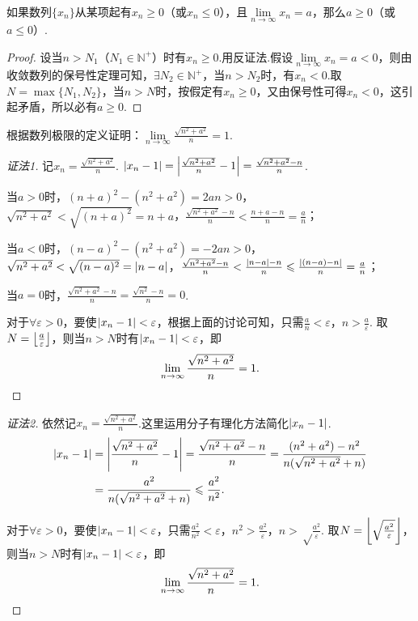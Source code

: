 \begin{corollary}
如果数列\(\{x_n\}\)从某项起有\(x_n \geqslant 0\)（或\(x_n \leqslant 0\)），且\(\lim\limits_{n\to\infty}x_n = a\)，那么\(a \geqslant 0\)（或\(a \leqslant 0\)）.
\begin{proof}
设当\(n > N_1\)（\(N_1 \in \mathbb{N}^+\)）时有\(x_n \geqslant 0\).用反证法.假设\(\lim\limits_{n\to\infty}x_n = a < 0\)，则由收敛数列的保号性定理可知，\(\exists N_2 \in \mathbb{N}^+\)，当\(n > N_2\)时，有\(x_n < 0\).取\(N = \max\{N_1,N_2\}\)，当\(n > N\)时，按假定有\(x_n \geqslant 0\)，又由保号性可得\(x_n < 0\)，这引起矛盾，所以必有\(a \geqslant 0\).
\end{proof}
\end{corollary}

\begin{example}
\def\l{\lim\limits_{n\to\infty}}
\def\ys{\l \frac{\sqrt{n^2+a^2}}{n}}
根据数列极限的定义证明：\(\ys = 1\).
\begin{proof}[证法1]
记\(x_n = \frac{\sqrt{n^2+a^2}}{n}\).
\(\abs{x_n-1} = \abs{\frac{\sqrt{n^2+a^2}}{n}-1} = \frac{\sqrt{n^2+a^2}-n}{n}\).

当\(a > 0\)时，\((n+a)^2-(n^2+a^2)=2an>0\)，\(\sqrt{n^2+a^2}<\sqrt{(n+a)^2}=n+a\)，\(\frac{\sqrt{n^2+a^2}-n}{n} < \frac{n+a-n}{n} = \frac{a}{n}\)；

当\(a < 0\)时，\((n-a)^2-(n^2+a^2)=-2an>0\)，\(\sqrt{n^2+a^2}<\sqrt{(n-a)^2}=\abs{n-a}\)，\(\frac{\sqrt{n^2+a^2}-n}{n} < \frac{\abs{n-a}-n}{n} \leqslant \frac{\abs{(n-a)-n}}{n} = \frac{a}{n}\)；

当\(a = 0\)时，\(\frac{\sqrt{n^2+a^2}-n}{n} = \frac{\sqrt{n^2}-n}{n} = 0\).

对于\(\forall\varepsilon>0\)，要使\(\abs{x_n-1}<\varepsilon\)，根据上面的讨论可知，只需\(\frac{a}{n}<\varepsilon\)，\(n>\frac{a}{\varepsilon}\).
取\(N = \floor*{\frac{a}{\varepsilon}}\)，则当\(n>N\)时有\(\abs{x_n-1}<\varepsilon\)，即\[
\ys = 1.
\qedhere
\]
\end{proof}
\begin{proof}[证法2]
依然记\(x_n = \frac{\sqrt{n^2+a^2}}{n}\).这里运用分子有理化方法简化\(\abs{x_n-1}\).
\begin{align*}
\abs{x_n-1} &= \abs{\frac{\sqrt{n^2+a^2}}{n}-1}
= \frac{\sqrt{n^2+a^2}-n}{n}
= \frac{(n^2+a^2)-n^2}{n (\sqrt{n^2+a^2}+n)} \\
&= \frac{a^2}{n (\sqrt{n^2+a^2}+n)}
\leqslant \frac{a^2}{n^2}.
\end{align*}

对于\(\forall\varepsilon>0\)，要使\(\abs{x_n-1}<\varepsilon\)，只需\(\frac{a^2}{n^2}<\varepsilon\)，\(n^2>\frac{a^2}{\varepsilon}\)，\(n>\sqrt\frac{a^2}{\varepsilon}\).
取\(N = \floor*{\sqrt\frac{a^2}{\varepsilon}}\)，则当\(n>N\)时有\(\abs{x_n-1}<\varepsilon\)，即\[
\ys = 1.
\qedhere
\]
\end{proof}
\end{example}


